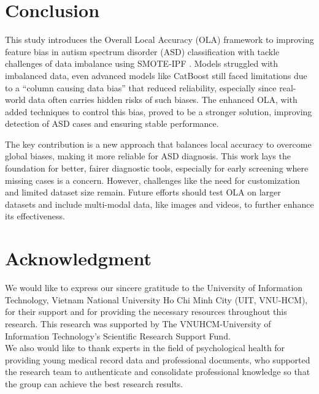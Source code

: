 \documentclass[conference]{IEEEtran}
\begin{document}
\section{Conclusion}
This study introduces the Overall Local Accuracy (OLA) framework to improving feature bias in autism spectrum disorder (ASD) classification with tackle challenges of data imbalance using SMOTE-IPF . Models struggled with imbalanced data, even advanced models like CatBoost still faced limitations due to a ``column causing data bias'' that reduced reliability, especially since real-world data often carries hidden risks of such biases. The enhanced OLA, with added techniques to control this bias, proved to be a stronger solution, improving detection of ASD cases and ensuring stable performance.

The key contribution is a new approach that balances local accuracy to overcome global biases, making it more reliable for ASD diagnosis. This work lays the foundation for better, fairer diagnostic tools, especially for early screening where missing cases is a concern. However, challenges like the need for customization and limited dataset size remain. Future efforts should test OLA on larger datasets and include multi-modal data, like images and videos, to further enhance its effectiveness.

\section{Acknowledgment}
We would like to express our sincere gratitude to the University of Information Technology, Vietnam National University Ho Chi Minh City (UIT, VNU-HCM), for their support and for providing the necessary resources throughout this research. This research was supported by The VNUHCM-University of Information Technology’s Scientific Research Support Fund.\\

We also would like to thank experts in the field of psychological health for providing young medical record data and professional documents, who supported the research team to authenticate and consolidate professional knowledge so that the group can achieve the best research results.
\end{document}
